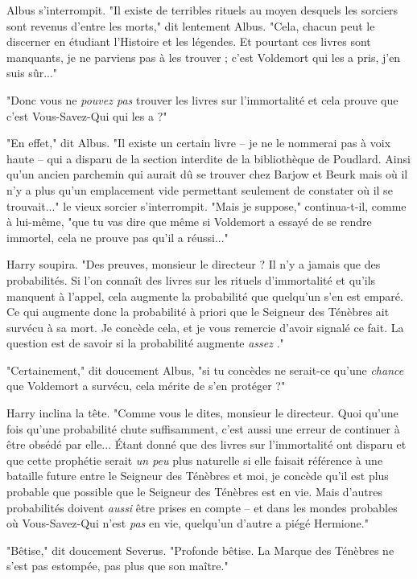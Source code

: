 Albus s'interrompit. "Il existe de terribles rituels au moyen desquels les sorciers sont revenus d'entre les morts," dit lentement Albus. "Cela, chacun peut le discerner en étudiant l'Histoire et les légendes. Et pourtant ces livres sont manquants, je ne parviens pas à les trouver ; c'est Voldemort qui les a pris, j'en suis sûr..."

"Donc vous ne \emph{pouvez pas } trouver les livres sur l'immortalité et cela prouve que c'est Vous-Savez-Qui qui les a ?"

"En effet," dit Albus. "Il existe un certain livre – je ne le nommerai pas à voix haute – qui a disparu de la section interdite de la bibliothèque de Poudlard. Ainsi qu'un ancien parchemin qui aurait dû se trouver chez Barjow et Beurk mais où il n'y a plus qu'un emplacement vide permettant seulement de constater où il se trouvait..." le vieux sorcier s'interrompit. "Mais je suppose," continua-t-il, comme à lui-même, "que tu vas dire que même si Voldemort a essayé de se rendre immortel, cela ne prouve pas qu'il a réussi..."

Harry soupira. "Des preuves, monsieur le directeur ? Il n'y a jamais que des probabilités. Si l'on connaît des livres sur les rituels d'immortalité et qu'ils manquent à l'appel, cela augmente la probabilité que quelqu'un s'en est emparé. Ce qui augmente donc la probabilité à priori que le Seigneur des Ténèbres ait survécu à sa mort. Je concède cela, et je vous remercie d'avoir signalé ce fait. La question est de savoir si la probabilité augmente \emph{assez} ."

"Certainement," dit doucement Albus, "si tu concèdes ne serait-ce qu'une \emph{chance}  que Voldemort a survécu, cela mérite de s'en protéger ?"

Harry inclina la tête. "Comme vous le dites, monsieur le directeur. Quoi qu'une fois qu'une probabilité chute suffisamment, c'est aussi une erreur de continuer à être obsédé par elle... Étant donné que des livres sur l'immortalité ont disparu et que cette prophétie serait \emph{un peu}  plus naturelle si elle faisait référence à une bataille future entre le Seigneur des Ténèbres et moi, je concède qu'il est plus probable que possible que le Seigneur des Ténèbres est en vie. Mais d'autres probabilités doivent \emph{aussi}  être prises en compte – et dans les mondes probables où Vous-Savez-Qui n'est \emph{pas}  en vie, quelqu'un d'autre a piégé Hermione."

"Bêtise," dit doucement Severus. "Profonde bêtise. La Marque des Ténèbres ne s'est pas estompée, pas plus que son maître."

